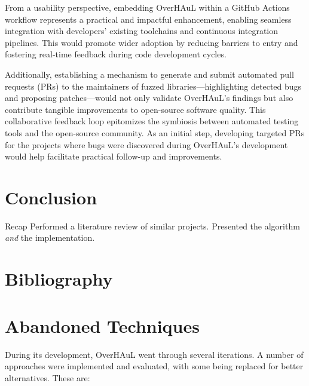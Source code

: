 \documentclass[
  a4paper,
]{scrreprt}
\theoremstyle{definition}
\theoremstyle{remark}
\begin{document}
From a usability perspective, embedding OverHAuL within a GitHub Actions
workflow represents a practical and impactful enhancement, enabling
seamless integration with developers' existing toolchains and continuous
integration pipelines. This would promote wider adoption by reducing
barriers to entry and fostering real-time feedback during code
development cycles.

Additionally, establishing a mechanism to generate and submit automated
pull requests (PRs) to the maintainers of fuzzed
libraries---highlighting detected bugs and proposing patches---would not
only validate OverHAuL's findings but also contribute tangible
improvements to open-source software quality. This collaborative
feedback loop epitomizes the symbiosis between automated testing tools
and the open-source community. As an initial step, developing targeted
PRs for the projects where bugs were discovered during OverHAuL's
development would help facilitate practical follow-up and improvements.


\chapter{Conclusion}\label{conclusion}

Recap Performed a literature review of similar projects. Presented the
algorithm \emph{and} the implementation.


\chapter*{Bibliography}\label{bibliography}


\printbibliography[heading=none]

\cleardoublepage
{}
{}
\appendix

\chapter{Abandoned Techniques}\label{sec-abandoned}

During its development, OverHAuL went through several iterations. A
number of approaches were implemented and evaluated, with some being
replaced for better alternatives. These are:
\end{document}
